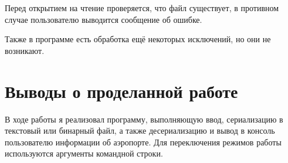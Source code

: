 \FloatBarrier

Перед открытием на чтение проверяется, что файл существует, в противном случае пользователю выводится сообщение об ошибке.

Также в программе есть обработка ещё некоторых исключений, но они не возникают.



\clearpage



\section{Выводы о проделанной работе}
В ходе работы я реализовал программу, выполняющую ввод, сериализацию в текстовый или бинарный файл, а также десериализацию и вывод в консоль пользователю информации об аэропорте. Для переключения режимов работы используются аргументы командной строки.